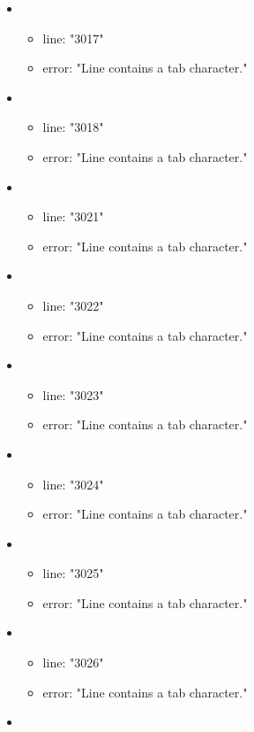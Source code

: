 \begin{itemize}
\begin{itemize}
	\end{itemize}
	\item 
	\begin{itemize} 
		\item line: "3017" 
		\item error: "Line contains a tab character." 
	\end{itemize}
	\item 
	\begin{itemize} 
		\item line: "3018" 
		\item error: "Line contains a tab character." 
	\end{itemize}
	\item 
	\begin{itemize} 
		\item line: "3021" 
		\item error: "Line contains a tab character." 
	\end{itemize}
	\item 
	\begin{itemize} 
		\item line: "3022" 
		\item error: "Line contains a tab character." 
	\end{itemize}
	\item 
	\begin{itemize} 
		\item line: "3023" 
		\item error: "Line contains a tab character." 
	\end{itemize}
	\item 
	\begin{itemize} 
		\item line: "3024" 
		\item error: "Line contains a tab character." 
	\end{itemize}
	\item 
	\begin{itemize} 
		\item line: "3025" 
		\item error: "Line contains a tab character." 
	\end{itemize}
	\item 
	\begin{itemize} 
		\item line: "3026" 
		\item error: "Line contains a tab character." 
	\end{itemize}
	\item 
	\begin{itemize} 

\end{itemize}
\end{itemize}
